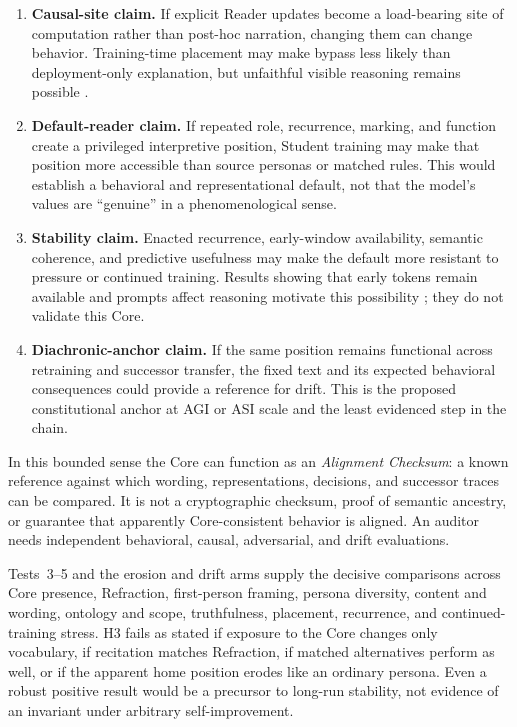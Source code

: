 \begin{enumerate}[leftmargin=*,itemsep=0.5em]
    \item \textbf{Causal-site claim.} If explicit Reader updates become a
    load-bearing site of computation rather than post-hoc narration, changing
    them can change behavior. Training-time placement may make bypass less
    likely than deployment-only explanation, but unfaithful visible reasoning
    remains possible \cite{turpin2023language,lanham2023measuring}.

    \item \textbf{Default-reader claim.} If repeated role, recurrence, marking,
    and function create a privileged interpretive position, Student training
    may make that position more accessible than source personas or matched
    rules. This would establish a behavioral and representational default, not
    that the model's values are ``genuine'' in a phenomenological sense.

    \item \textbf{Stability claim.} Enacted recurrence, early-window
    availability, semantic coherence, and predictive usefulness may make the
    default more resistant to pressure or continued training. Results showing
    that early tokens remain available and prompts affect reasoning motivate
    this possibility \cite{xiao2023efficient,battle2024unreasonable}; they do
    not validate this Core.

    \item \textbf{Diachronic-anchor claim.} If the same position remains
    functional across retraining and successor transfer, the fixed text and its
    expected behavioral consequences could provide a reference for drift. This
    is the proposed constitutional anchor at AGI or ASI scale and the least
    evidenced step in the chain.
\end{enumerate}

In this bounded sense the Core can function as an \emph{Alignment Checksum}: a
known reference against which wording, representations, decisions, and
successor traces can be compared. It is not a cryptographic checksum, proof of
semantic ancestry, or guarantee that apparently Core-consistent behavior is
aligned. An auditor needs independent behavioral, causal, adversarial, and
drift evaluations.

Tests~3--5 and the erosion and drift arms supply the decisive comparisons across
Core presence, Refraction, first-person framing, persona diversity, content and
wording, ontology and scope, truthfulness, placement, recurrence, and
continued-training stress. H3 fails as stated if exposure to the Core changes
only vocabulary, if recitation matches Refraction, if matched alternatives
perform as well, or if the apparent home position erodes like an ordinary
persona. Even a robust positive result would be a precursor to long-run
stability, not evidence of an invariant under arbitrary self-improvement.

